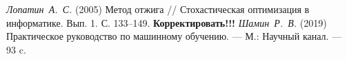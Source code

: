 \clearpage                                  %




\begin{thebibliography}{7}
	 \textit{Лопатин\ А.\ С.} (2005) Метод отжига // Стохастическая оптимизация
в информатике. Вып. 1. С. 133–149. \textbf{Корректировать!!!}
	 \textit{Шамин\ Р.\ В.} (2019) Практическое руководство по машинному обучению. — М.: Научный канал. — 93 c.
\end{thebibliography}
